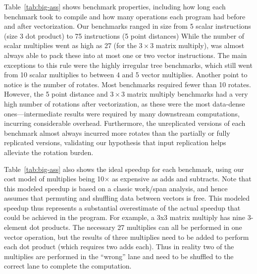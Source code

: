 Table~\ref{tab:big-ass} shows benchmark properties, including how long each benchmark took to compile and how many operations each program had before and after vectorization.
Our benchmarks ranged in size from 5 scalar instructions (size 3 dot product) to 75 instructions (5 point distances) %
While the number of scalar multiplies went as high as 27 (for the $3\times 3$ matrix multiply), \system was almost always able to pack these into at most one or two vector instructions.
The main exceptions to this rule were the highly irregular tree benchmarks, which still went from 10 scalar multiplies to between 4 and 5 vector multiplies.
Another point to notice is the number of rotates. Most benchmarks required fewer than 10 rotates. However, the 5 point distance and $3\times 3$ matrix multiply benchmarks had a very high number of rotations after vectorization, as these were the most data-dense ones---intermediate results were required by many downstream computations, incurring considerable overhead. %
Furthermore, the unreplicated versions of each benchmark almost always incurred more rotates than the partially or fully replicated versions, validating our hypothesis that input replication helps alleviate the rotation burden. %

Table~\ref{tab:big-ass} also shows the ideal speedup for each benchmark, using our cost model of multiplies being 10$\times$ as expensive as adds and subtracts. Note that this modeled speedup is based on a classic work/span analysis, and hence assumes that permuting and shuffling data between vectors is free. This modeled speedup thus represents a substantial overestimate of the actual speedup that could be achieved in the program. For example, a \textsf{3x3} matrix multiply has nine 3-element dot products. The necessary 27 multiplies can all be performed in one vector operation, but the results of three multiplies need to be added to perform each dot product (which requires two adds each). Thus in reality two of the multiplies are performed in the ``wrong'' lane and need to be shuffled to the correct lane to complete the computation.

